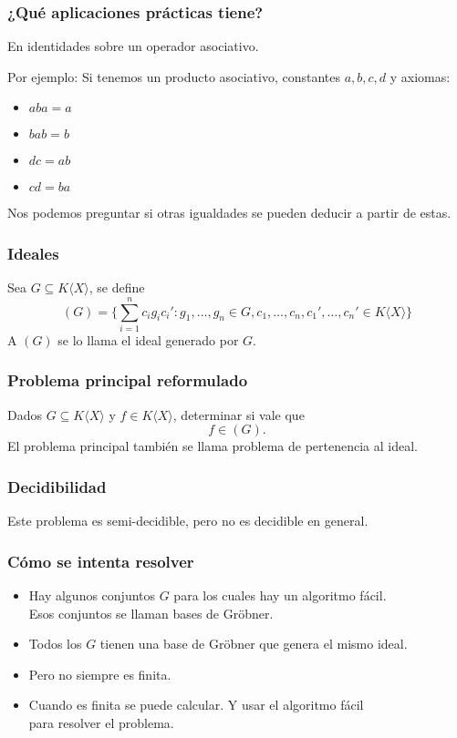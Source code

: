 \documentclass[spanish, aspectratio=169, hidecontrols]{beamer}
\begin{document}
\begin{frame}
  \frametitle{¿Qué aplicaciones prácticas tiene?}

  En identidades sobre un operador asociativo.
  \begin{exampleblock}{Por ejemplo:}
    Si tenemos un producto asociativo, constantes $a, b, c, d$ y axiomas:
    \begin{itemize}
      \item $aba = a$
      \item $bab = b$
      \item $dc = ab$
      \item $cd = ba$
    \end{itemize}
    Nos podemos preguntar si otras igualdades se pueden deducir a partir de estas.
  \end{exampleblock}
\end{frame}

\begin{frame}
  \frametitle{Ideales}
  \pause
  Sea $G ⊆ K⟨X⟩$, se define
  \[ (G) = \{∑_{i = 1}^n c_i g_i c_i' : g_1, …, g_n ∈ G, c_1, …, c_n, c_1', …, c_n' ∈ K⟨X⟩\} \]
  A $(G)$ se lo llama el ideal generado por $G$.
\end{frame}

\begin{frame}
  \frametitle{Problema principal reformulado}
  Dados $G ⊆ K⟨X⟩$ y $f ∈ K⟨X⟩$, determinar si vale que
  \[ f ∈ (G) \text{.} \]
  \pause
  El problema principal también se llama problema de pertenencia al ideal.
\end{frame}

\begin{frame}
  \frametitle{Decidibilidad}
  \pause
  Este problema es semi-decidible\pause, pero no es decidible en general.
\end{frame}

\begin{frame}
  \frametitle{Cómo se intenta resolver}
  \begin{itemize}
    \item Hay algunos conjuntos $G$ para los cuales hay un algoritmo fácil. \pause \\
    Esos conjuntos se llaman bases de Gröbner.
    \pause
    \item Todos los $G$ tienen una base de Gröbner que genera el mismo ideal.
    \pause
    \item Pero no siempre es finita.
    \pause
    \item Cuando es finita se puede calcular. \pause Y usar el algoritmo fácil \\ para resolver el problema.
  \end{itemize}
\end{frame}
\end{document}
